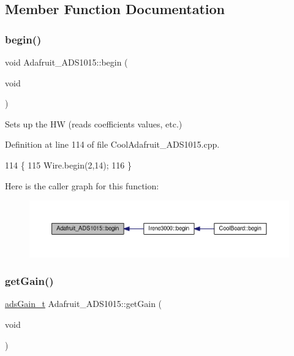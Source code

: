 \subsection{Member Function Documentation}
\mbox{\label{class_adafruit___a_d_s1015_a6eba7c3cd854927f60883bb371e5faa6}} 
\subsubsection{\texorpdfstring{begin()}{begin()}}
{\footnotesize\ttfamily void Adafruit\+\_\+\+A\+D\+S1015\+::begin (\begin{DoxyParamCaption}\item[{void}]{ }\end{DoxyParamCaption})}



Sets up the HW (reads coefficients values, etc.) 



Definition at line 114 of file Cool\+Adafruit\+\_\+\+A\+D\+S1015.\+cpp.


\begin{DoxyCode}
114                              \{
115   Wire.begin(2,14);
116 \}
\end{DoxyCode}
Here is the caller graph for this function\+:\nopagebreak
\begin{figure}[H]
\begin{center}
\leavevmode
\includegraphics[width=350pt]{df/df6/class_adafruit___a_d_s1015_a6eba7c3cd854927f60883bb371e5faa6_icgraph}
\end{center}
\end{figure}
\mbox{\label{class_adafruit___a_d_s1015_a6232d089aaa82226bc34623fdf92237c}} 
\subsubsection{\texorpdfstring{get\+Gain()}{getGain()}}
{\footnotesize\ttfamily \hyperlink{_cool_adafruit___a_d_s1015_8h_a3d6c0e15829a207b9155890811fa4781}{ads\+Gain\+\_\+t} Adafruit\+\_\+\+A\+D\+S1015\+::get\+Gain (\begin{DoxyParamCaption}\item[{void}]{ }\end{DoxyParamCaption})}



